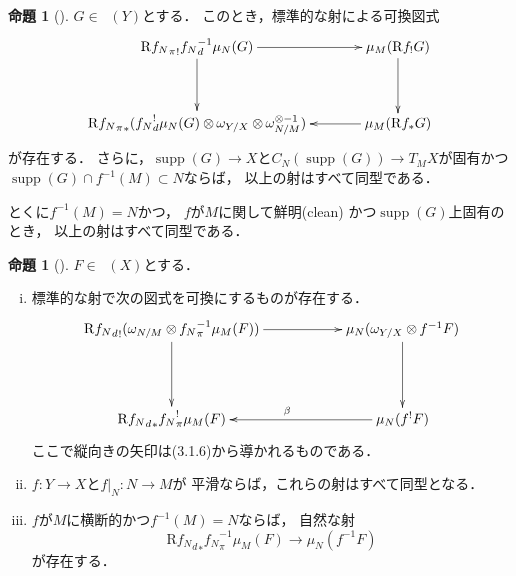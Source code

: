 \documentclass[leqno, 10pt, a4paper, dvipdfmx]{jsarticle}
\theoremstyle{definition}
\numberwithin{equation}{section}
\newcommand{\supp}{\mathop{\mathrm{supp}}\nolimits}
\newcommand{\Dompb}{\mathop{\mathsf{D}^\mathrm{b}}\nolimits}
\newcommand{\Rder}{\mathrm{R}}
\newcommand{\tens}[1][]{\mathbin{\otimes_{\raise1.5ex\hbox to-.1em{}{#1}}}}
\newcommand{\mres}[2][]{{\left.{#1}\right\rvert}_{#2}}
\theoremstyle{mystyle}
\newtheorem{PRP}[AXM]{命題}
\renewenvironment{leftbar}{%
  \def\FrameCommand{\textcolor{lightgray}{\vrule width 4pt} \hspace{10pt}}%
  \MakeFramed {\advance\hsize-\width \FrameRestore}}%
{\endMakeFramed}
\newcommand{\mpb}[1][]{{#1}_{\pi}} %
\newcommand{\mdiff}[1][]{{#1}_{d}} %
\begin{document}
\begin{leftbar}
\begin{PRP}[{\cite[Prop.4.3.4]{KS90}}]\label{prp4.3.4}
  \(G\in\Dompb(Y)\)とする．
  このとき，標準的な射による可換図式    
  \[    
      \vcenter{\xymatrix@C=36pt@R=36pt{
      \Rder{{\mpb[f_{N}]}_{!}}{\mdiff[f_{N}]^{-1}}\mu_{N}(G)
      \ar[d]
      \ar[r]
      &
      \mu_{M}(\Rder{f_{!}}G)
      \ar[d]
      \\
      \Rder{{\mpb[f_{N}]}_{\ast}}({\mdiff[f_{N}]^{!}}\mu_{N}(G)\tens[]\omega_{Y/X}\tens[]\omega_{N/M}^{\otimes{-1}})
      &
      \mu_{M}(\Rder{f_{\ast}}G)
      \ar[l]
      }}
  \]が存在する．
  さらに，\(\supp(G)\to X\)と\(
      C_N(\supp(G))\to T_{M}X
  \)が固有かつ\(\supp(G)\cap f^{-1}(M)\subset N\)ならば，
  以上の射はすべて同型である．
  
  とくに\(f^{-1}(M)=N\)かつ，
  \(f\)が\(M\)に関して鮮明\footnotemark[2] (clean) かつ\(\supp(G)\)上固有のとき，
  以上の射はすべて同型である．
\end{PRP}
\end{leftbar}


\begin{leftbar}
\begin{PRP}[{\cite[Prop.4.3.5]{KS90}}]\label{prp4.3.5}
  \(F\in\Dompb(X)\)とする．
  \begin{enumerate}[(i)]
      \item 標準的な射で次の図式を可換にするものが存在する．\label{prp4.3.5.1}
      \[\vcenter{\xymatrix@C=56pt@R=46pt{
          \Rder{{\mdiff[f_N]}_{!}}(\omega_{N/M}\tens[]{\mpb[f_N]^{-1}}\mu_{M}(F))
          \ar[d]^{}
          \ar[r]_{}
          &
          \mu_{N}(\omega_{Y/X}\tens[]{f^{-1}}F)
          \ar[d]
          \\
          \Rder{{\mdiff[f_N]}_{\ast}}{\mpb[f_N]^{!}}\mu_{M}(F)
          &
          \mu_{N}({f^{!}}F)
          \ar[l]_{\beta}
      }}\]
      ここで縦向きの矢印は(3.1.6)から導かれるものである．
      \item \label{prp4.3.5.2}
      \(f\colon Y\to X\)と\(\mres[f]{N}\colon N\to M\)が
      平滑ならば，これらの射はすべて同型となる．    
      \item \label{prp4.3.5.3}
      \(f\)が\(M\)に横断的かつ\(f^{-1}(M)=N\)ならば，
      自然な射\[
          \Rder{{\mdiff[f_N]}_{\ast}}\mpb[f_N]^{-1}\mu_{M}(F)
          \to \mu_{N}(f^{-1}F)
      \]が存在する．
  \end{enumerate}
\end{PRP}
\end{leftbar}
\end{document}
